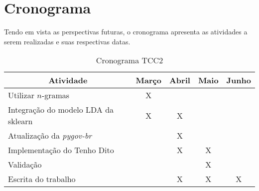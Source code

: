 \clearpage
\section{Cronograma}

Tendo em vista as perspectivas futuras, o cronograma apresenta as atividades a serem realizadas e suas respectivas datas.
\begin{table}[h]
\centering
\begin{tabular}{|l|c|c|c|c|}
\hline
\multicolumn{1}{|c|}{\textbf{Atividade}} & \multicolumn{1}{c|}{\textbf{Março}} & \multicolumn{1}{c|}{\textbf{Abril}} & \multicolumn{1}{c|}{\textbf{Maio}} & \multicolumn{1}{c|}{\textbf{Junho}} \\ \hline
Utilizar \(n\)-gramas & X &  &  &  \\ \hline
Integração do modelo LDA da sklearn & X & X &  &  \\ \hline
Atualização da \textit{pygov-br} &  & X  &  &  \\ \hline
Implementação do Tenho Dito &  & X & X  &  \\ \hline
Validação &  &  & X  &  \\ \hline
Escrita do trabalho &  & X & X & X \\ \hline
\end{tabular}
\caption{Cronograma TCC2}
\label{my-label}
\end{table}
